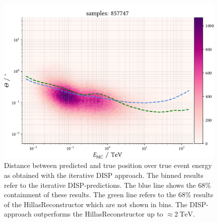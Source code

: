 \begin{figure}
    \centering
    \captionsetup{width=0.9\linewidth}
    \includegraphics[width=0.9\linewidth]{../analysis/plots/gamma/pairwise_median_100_vs_energy.pdf} 
    \caption{Distance between predicted and true position over true event energy as obtained with the
    iterative DISP approach.
    The binned results refer to the iterative DISP-predictions. The blue line shows the 
    68\% containment of these results. The green line refers to the 68\%
    results of the HillasReconstructor which are not shown in bins.
    The DISP-approach outperforms the HillasReconstructor up to
    $\approx \SI{2}{\tera\electronvolt}$.}
    \label{fig:stereo_magic_energy}
\end{figure}

